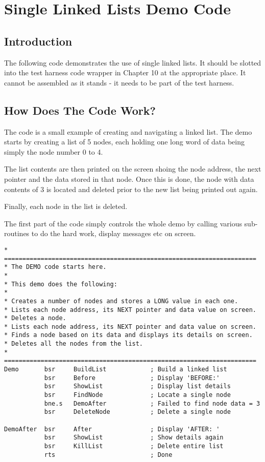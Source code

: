 \chapter{Single Linked Lists Demo Code}
 
\section{Introduction}
\label{ch11-intro}%

The following code demonstrates the use of single linked lists. It
    should be slotted into the test harness code wrapper in Chapter 10 at the
    appropriate place. It cannot be assembled as it stands -{} it needs to be
    part of the test harness.

\section{How Does The Code Work?}
\label{ch11-single-code}%

The code is a small example of creating and navigating a linked
    list. The demo starts by creating a list of 5 nodes, each holding one long
    word of data being simply the node number 0 to 4.

The list contents are then printed on the screen shoing the node
    address, the next pointer and the data stored in that node. Once this is
    done, the node with data contents of 3 is located and deleted prior to the
    new list being printed out again.

Finally, each node in the list is deleted.

The first part of the code simply controls the whole demo by calling
    various sub-{}routines to do the hard work, display messages etc on
    screen.

\begin{lstlisting}[firstnumber=1,caption={Single Linked List - Demo Code}]
* =====================================================================
* The DEMO code starts here.
*
* This demo does the following:
*
* Creates a number of nodes and stores a LONG value in each one.
* Lists each node address, its NEXT pointer and data value on screen.
* Deletes a node.
* Lists each node address, its NEXT pointer and data value on screen.
* Finds a node based on its data and displays its details on screen.
* Deletes all the nodes from the list.
* =====================================================================
Demo       bsr     BuildList            ; Build a linked list
           bsr     Before               ; Display 'BEFORE:'
           bsr     ShowList             ; Display list details
           bsr     FindNode             ; Locate a single node
           bne.s   DemoAfter            ; Failed to find node data = 3
           bsr     DeleteNode           ; Delete a single node

DemoAfter  bsr     After                ; Display 'AFTER: '
           bsr     ShowList             ; Show details again
           bsr     KillList             ; Delete entire list
           rts                          ; Done
\end{lstlisting}

